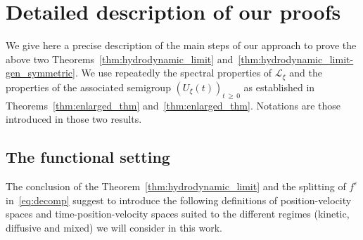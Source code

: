 \documentclass[AHL,Unicode,longabstracts,published]{cedram}
\newcommand{\LL}{\mathcal{L}}
\renewcommand*\ge{\geqslant}
\newcommand*\eps{{\varepsilon}}
\begin{document}
\section{Detailed description of our proofs}\label{sec:detail}

We give here a precise description of the main steps of our approach to prove the above two Theorems~\ref{thm:hydrodynamic_limit} and~\ref{thm:hydrodynamic_limit-gen_symmetric}. We use repeatedly the spectral properties of $\LL_\xi$ and the properties of the associated semigroup $(U_\xi(t))_{t\,\ge\,0}$ as established in Theorems~\ref{thm:enlarged_thm} and~\ref{thm:enlarged_thm}. Notations are those introduced in those two results.


\subsection{The functional setting}

The conclusion of the Theorem~\ref{thm:hydrodynamic_limit} and the splitting of $f^\eps$ in~\eqref{eq:decomp} suggest to introduce the following definitions of position-velocity spaces and time-position-velocity spaces suited to the different regimes (kinetic, diffusive and mixed) we will consider in this work.
\end{document}
